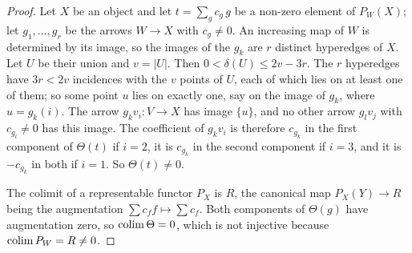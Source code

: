\begin{proof}
Let $X$ be an object and let $t=\sum_g c_g\,g$ be a non-zero element of
$P_W(X)$; let $g_1,\dots,g_r$ be the arrows $W\to X$ with $c_g\ne 0$. An
increasing map of $W$ is determined by its image, so the images of the $g_k$
are $r$ distinct hyperedges of $X$. Let $U$ be their union and $v=|U|$. Then
$0<\delta(U)\le 2v-3r$. The $r$ hyperedges have $3r<2v$ incidences with the $v$
points of $U$, each of which lies on at least one of them; so some point $u$
lies on exactly one, say on the image of $g_k$, where $u=g_k(i)$. The arrow
$g_kv_i\colon V\to X$ has image $\{u\}$, and no other arrow $g_lv_j$ with
$c_{g_l}\ne 0$ has this image. The coefficient of $g_kv_i$ is therefore
$c_{g_k}$ in the first component of $\Theta(t)$ if $i=2$, it is $c_{g_k}$ in the
second component if $i=3$, and it is $-c_{g_k}$ in both if $i=1$. So
$\Theta(t)\ne 0$.

The colimit of a representable functor $P_X$ is $R$, the canonical map
$P_X(Y)\to R$ being the augmentation $\sum c_f f\mapsto\sum c_f$. Both
components of $\Theta(g)$ have augmentation zero, so $\operatorname{colim}\Theta=0$, which is
not injective because $\operatorname{colim} P_W=R\ne 0$.
\end{proof}
